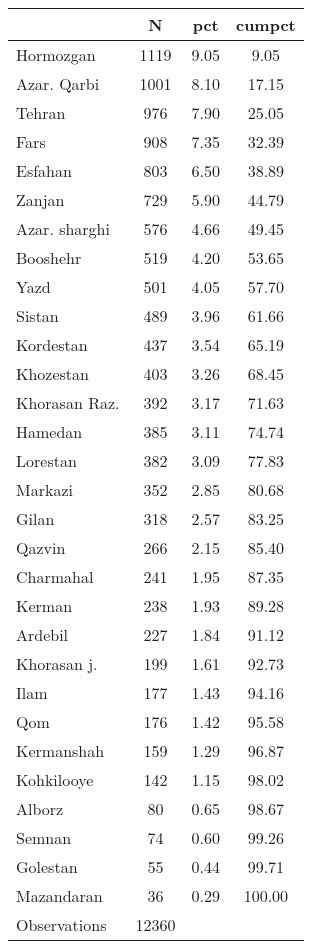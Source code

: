 {
\def\sym#1{\ifmmode^{#1}\else\(^{#1}\)\fi}
\begin{tabular}{l*{1}{ccc}}
\toprule
                &        N&      pct&   cumpct\\
\midrule
Hormozgan       &     1119&     9.05&     9.05\\
Azar. Qarbi     &     1001&     8.10&    17.15\\
Tehran          &      976&     7.90&    25.05\\
Fars            &      908&     7.35&    32.39\\
Esfahan         &      803&     6.50&    38.89\\
Zanjan          &      729&     5.90&    44.79\\
Azar. sharghi   &      576&     4.66&    49.45\\
Booshehr        &      519&     4.20&    53.65\\
Yazd            &      501&     4.05&    57.70\\
Sistan          &      489&     3.96&    61.66\\
Kordestan       &      437&     3.54&    65.19\\
Khozestan       &      403&     3.26&    68.45\\
Khorasan Raz.   &      392&     3.17&    71.63\\
Hamedan         &      385&     3.11&    74.74\\
Lorestan        &      382&     3.09&    77.83\\
Markazi         &      352&     2.85&    80.68\\
Gilan           &      318&     2.57&    83.25\\
Qazvin          &      266&     2.15&    85.40\\
Charmahal       &      241&     1.95&    87.35\\
Kerman          &      238&     1.93&    89.28\\
Ardebil         &      227&     1.84&    91.12\\
Khorasan j.     &      199&     1.61&    92.73\\
Ilam            &      177&     1.43&    94.16\\
Qom             &      176&     1.42&    95.58\\
Kermanshah      &      159&     1.29&    96.87\\
Kohkilooye      &      142&     1.15&    98.02\\
Alborz          &       80&     0.65&    98.67\\
Semnan          &       74&     0.60&    99.26\\
Golestan        &       55&     0.44&    99.71\\
Mazandaran      &       36&     0.29&   100.00\\
\midrule
Observations    &    12360&         &         \\
\bottomrule
\end{tabular}
}
